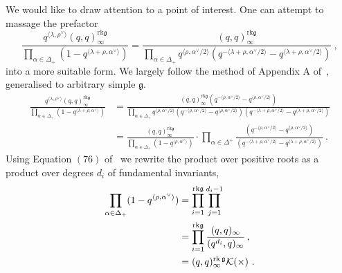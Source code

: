 \documentclass[a4paper]{article}
\def\KK{{\cal K}}
\def\gf{\mathfrak{g}}
\begin{document}
We would like to draw attention to a point of interest. One can attempt to massage the prefactor
\begin{equation}\label{eq:rearr2}
	\frac{q^{\langle\lambda,\rho^\vee\rangle} (q,q)_\infty^{\mathrm{rk}\mathfrak{g}}}{\prod_{\alpha\in\Delta_+} \left( 1-q^{\langle\lambda + \rho,\alpha^\vee\rangle} \right)} = \frac{(q,q)^{\mathrm{rk}\mathfrak{g}}_\infty}{\prod_{\alpha\in\Delta_+}q^{\langle\rho,\alpha^\vee/2\rangle}(q^{-\langle\lambda+\rho,\alpha^\vee/2\rangle}-q^{\langle\lambda+\rho,\alpha^\vee/2\rangle})}~,
\end{equation}
into a more suitable form. We largely follow the method of Appendix A of~\cite{Lemos:2014lua}, generalised to arbitrary simple $\gf$.
\begin{equation}
	\begin{split}
	\frac{q^{\langle\lambda,\rho^\vee\rangle} (q,q)_\infty^{\mathrm{rk}\mathfrak{g}}}{\prod_{\alpha\in\Delta_+} \left( 1-q^{\langle\lambda + \rho,\alpha^\vee\rangle} \right)} &= \frac{(q,q)_\infty^{\mathrm{rk}\mathfrak{g}}(q^{-\langle \rho,\alpha^\vee/2\rangle}-q^{\langle \rho,\alpha^\vee/2\rangle})}{\prod_{\alpha\in\Delta_+}q^{\langle\rho,\alpha^\vee/2\rangle}(q^{-\langle \rho,\alpha^\vee/2\rangle}-q^{\langle \rho,\alpha^\vee/2\rangle})(q^{-\langle\lambda+\rho,\alpha^\vee/2\rangle}-q^{\langle\lambda+\rho,\alpha^\vee/2\rangle})} \\
	&= \frac{(q,q)_\infty^{\mathrm{rk}\mathfrak{g}}}{\prod_{\alpha\in\Delta_+}(1-q^{\langle \rho,\alpha^\vee\rangle})}\cdot\prod_{\alpha\in\Delta^+} \frac{ (q^{-\langle \rho,\alpha^\vee/2\rangle}-q^{\langle \rho,\alpha^\vee/2\rangle})}{(q^{-\langle\lambda+\rho,\alpha^\vee/2\rangle}-q^{\langle\lambda+\rho,\alpha^\vee/2\rangle})}~.
	\end{split}
\end{equation}
Using Equation $(76)$ of~\cite{Arakawa:2018egx} we rewrite the product over positive roots as a product over degrees $d_i$ of fundamental invariants,
\begin{equation}
	\begin{split}
	\prod_{\alpha\in\Delta_+} (1-q^{\langle \rho,\alpha^\vee \rangle}) &= \prod_{i=1}^{\mathrm{rk}\mathfrak{g}}\prod_{j=1}^{d_i-1} \\
	&= \prod_{i=1}^{\mathrm{rk}\mathfrak{g}}\frac{(q,q)_\infty}{(q^{d_i},q)_\infty} \, ,\\
	&= (q,q)^{\mathrm{rk}\,\gf}_\infty \KK(\times)~.
	\end{split}
\end{equation}
\end{document}
